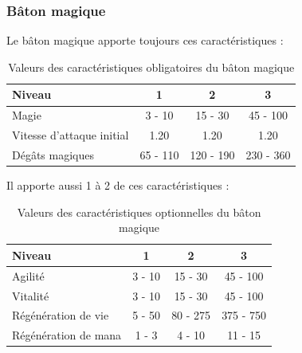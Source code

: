 \documentclass[11pt, a4paper, oneside]{report}
\begin{document}
\subsubsection{Bâton magique}
Le bâton magique apporte toujours ces caractéristiques :
\begin{table}[H]
\begin{center}
\begin{tabular}{| l | c | c | c |}
  \hline      
  Niveau 				& 1 & 2 & 3\\ \hline \hline
  Magie 				& 3 - 10 & 15 - 30 & 45 - 100\\ \hline
  Vitesse d'attaque initial	& 1.20 & 1.20 & 1.20\\ \hline
  Dégâts magiques 		& 65 - 110 & 120 - 190 & 230 - 360\\ \hline
\end{tabular}
\caption{Valeurs des caractéristiques obligatoires du bâton magique}
\end{center}
\end{table}
Il apporte aussi 1 à 2 de ces caractéristiques :
\begin{table}[H]
\begin{center}
\begin{tabular}{| l | c | c | c |}
  \hline      
  Niveau 				& 1 & 2 & 3\\ \hline \hline
  Agilité 				& 3 - 10 & 15 - 30 & 45 - 100\\ \hline
  Vitalité 				& 3 - 10 & 15 - 30 & 45 - 100\\ \hline
  Régénération de vie 	& 5 - 50  & 80 - 275 & 375 - 750\\ \hline
  Régénération de mana 	& 1 - 3  & 4 - 10 & 11 - 15\\ \hline
\end{tabular}
\caption{Valeurs des caractéristiques optionnelles du bâton magique}
\end{center}
\end{table}
\end{document}
